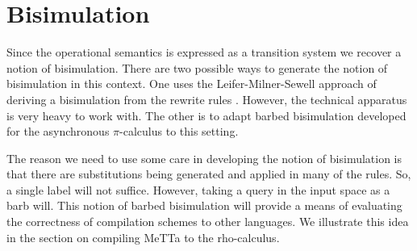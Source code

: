 \section{Bisimulation}
Since the operational semantics is expressed as a transition system we recover a notion of bisimulation. There are two possible ways to generate the notion of bisimulation in this context. One uses the Leifer-Milner-Sewell approach of deriving a bisimulation from the rewrite rules \cite{DBLP:conf/concur/LeiferM00}. However, the technical apparatus is very heavy to work with. The other is to adapt barbed bisimulation developed for the asynchronous $\pi$-calculus to this setting.

The reason we need to use some care in developing the notion of bisimulation is that there are substitutions being generated and applied in many of the rules. So, a single label will not suffice. However, taking a query in the input space as a barb will. This notion of barbed bisimulation will provide a means of evaluating the correctness of compilation schemes to other languages. We illustrate this idea in the section on compiling MeTTa to the rho-calculus.
